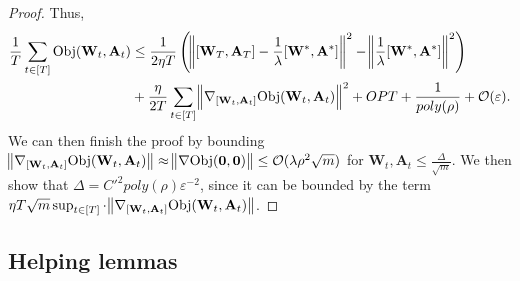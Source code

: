 \begin{proof}
 Thus, 
	\begin{align*}
		\frac{1}{T} \sum_{t \in [T]} \mathrm{Obj}(\mathbf{W}_t, \mathbf{A}_t) &\le  \frac{1}{2\eta T}  \left(\norm{[\mathbf{W}_T, \mathbf{A}_T] - \frac{1}{\lambda}[\mathbf{W}^{\ast}, \mathbf{A}^{\ast}]}^2 - \norm{ \frac{1}{\lambda}[\mathbf{W}^{\ast}, \mathbf{A}^{\ast}]}^2 \right)  \\& + \frac{\eta}{2T} \sum_{t \in [T]} \norm{\nabla_{[\mathbf{W}_t, \mathbf{A}_t]} \mathrm{Obj}(\mathbf{W}_t, \mathbf{A}_t)}^2 + OPT + \frac{1}{poly(\rho)} +  \mathcal{O}(\varepsilon).
	\end{align*}
	We can then finish the proof by bounding $ \norm[1]{\nabla_{[\mathbf{W}_t, \mathbf{A}_t]} \mathrm{Obj}(\mathbf{W}_t, \mathbf{A}_t)} \approx \norm[1]{\nabla \mathrm{Obj}(\mathbf{0}, \mathbf{0})} \le \mathcal{O}(\lambda \rho^2 \sqrt{m})$ for $\mathbf{W}_t, \mathbf{A}_t \le \frac{\Delta}{\sqrt{m}}$. We then show that $\Delta =  C'^2 poly(\rho) \varepsilon^{-2}$, since it can be bounded by the term $\eta T \sqrt{m} \sup_{t \in [T]} \cdot \norm[1]{\nabla_{[\mathbf{W}_t, \mathbf{A}_t]} \mathrm{Obj}(\mathbf{W}_t, \mathbf{A}_t)}$.
\end{proof}




\subsection{Helping lemmas}

